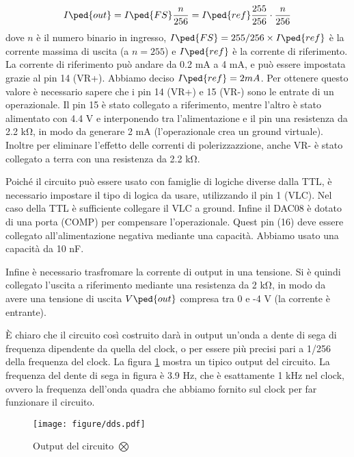 \begin{equation}
	I\ped{out} = I\ped{FS} \frac{n}{256} = I\ped{ref} \frac{255}{256} \cdot \frac{n}{256}
\end{equation}
%
dove $n$ è il numero binario in ingresso, $I\ped{FS} = 255/256 \times I\ped{ref}$ è la corrente massima di uscita (a $n = 255$)
e $I\ped{ref}$ è la corrente di riferimento. La corrente di riferimento può andare da 0.2 mA a 4 mA, e può essere impostata
grazie al pin 14 (VR+). Abbiamo deciso $I\ped{ref} = 2 mA$. Per ottenere questo valore è necessario sapere che
i pin 14 (VR+) e 15 (VR-) sono le entrate di un operazionale. Il pin 15 è stato collegato a riferimento, mentre l'altro è stato alimentato
con 4.4 V e interponendo tra l'alimentazione e il pin una resistenza da 2.2 \si{\kilo\ohm}, in modo da generare 2 mA (l'operazionale crea un
ground virtuale). Inoltre per eliminare l'effetto delle correnti di polerizzazzione, anche VR- è stato collegato a terra con una resistenza
da 2.2 \si{\kilo\ohm}.

Poiché il circuito può essere usato con famiglie di logiche diverse dalla TTL, è necessario impostare
il tipo di logica da usare, utilizzando il pin 1 (VLC). Nel caso della TTL è sufficiente collegare il VLC a ground.
Infine il DAC08 è dotato di una porta (COMP) per compensare l'operazionale. Quest pin (16) deve essere collegato all'alimentazione negativa
mediante una capacità. Abbiamo usato una capacità da 10 nF.

Infine è necessario trasfromare la corrente di output in una tensione. Si è quindi collegato l'uscita a
riferimento mediante una resistenza da 2 \si{\kilo\ohm}, in modo da avere una tensione di uscita $V\ped{out}$
compresa tra 0 e -4 V (la corrente è entrante).

È chiaro che il circuito così costruito darà in output un'onda a dente di sega di frequenza dipendente da quella del clock,
o per essere più precisi pari a 1/256 della frequenza del clock. La figura \ref{fig:dds12} mostra un tipico output del circuito.
La frequenza del dente di sega in figura è 3.9 Hz, che è esattamente 1 kHz nel clock, ovvero la frequenza dell'onda quadra che abbiamo
fornito sul clock per far funzionare il circuito.

\begin{figure}
    \texttt{[image: figure/dds.pdf]}
    \caption{Output del circuito $\bigotimes$}
    \label{fig:dds12}
\end{figure}
